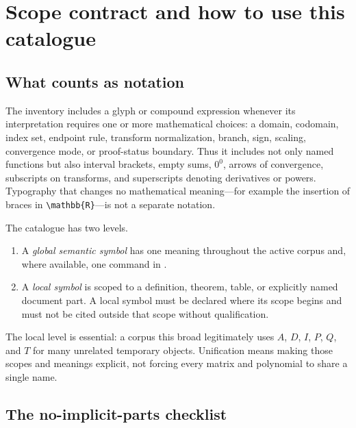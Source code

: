 \documentclass[11pt,oneside]{article}
\theoremstyle{definition}
\theoremstyle{remark}
\DeclareRobustCommand{\shortpath}[1]{\mbox{\path{#1}}}
\DeclareRobustCommand{\modulepath}[1]{\shortpath{#1}}
\DeclareRobustCommand{\commandname}[1]{\texttt{\textbackslash#1}}
\begin{document}
\tableofcontents
\newpage


\section{Scope contract and how to use this catalogue}

\subsection{What counts as notation}

The inventory includes a glyph or compound expression whenever its interpretation requires
one or more mathematical choices: a domain, codomain, index set, endpoint rule, transform
normalization, branch, sign, scaling, convergence mode, or proof-status boundary.  Thus it
includes not only named functions but also interval brackets, empty sums, $0^0$, arrows of
convergence, subscripts on transforms, and superscripts denoting derivatives or powers.
Typography that changes no mathematical meaning---for example the insertion of braces in
\commandname{mathbb}\texttt{\{R\}}---is not a separate notation.

The catalogue has two levels.
\begin{enumerate}
\item A \emph{global semantic symbol} has one meaning throughout the active corpus and,
      where available, one command in \modulepath{fabius-notation.tex}.
\item A \emph{local symbol} is scoped to a definition, theorem, table, or explicitly named
      document part.  A local symbol must be declared where its scope begins and must not
      be cited outside that scope without qualification.
\end{enumerate}
The local level is essential: a corpus this broad legitimately uses $A$, $D$, $I$, $P$,
$Q$, and $T$ for many unrelated temporary objects.  Unification means making those scopes
and meanings explicit, not forcing every matrix and polynomial to share a single name.

\subsection{The no-implicit-parts checklist}
\end{document}
